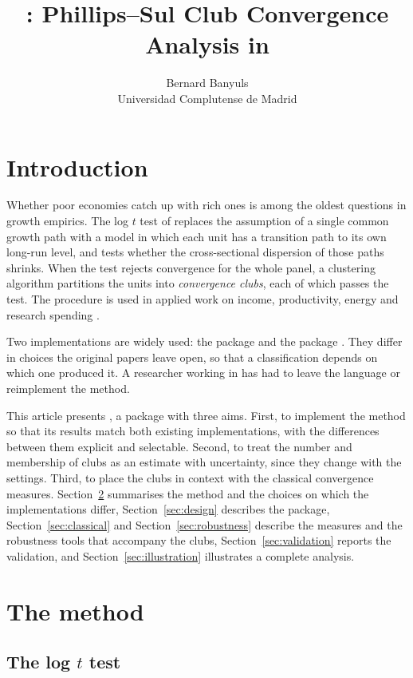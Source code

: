 \documentclass[article]{jss}
\author{Bernard Banyuls\\Universidad Complutense de Madrid}
\title{\pkg{convergence-clubs}: Phillips--Sul Club Convergence Analysis in \proglang{Python}}
\begin{document}
\section{Introduction} \label{sec:intro}

Whether poor economies catch up with rich ones is among the oldest questions in growth
empirics. The log $t$ test of \citet{PhillipsSul2007} replaces the assumption of a single
common growth path with a model in which each unit has a transition path to its own
long-run level, and tests whether the cross-sectional dispersion of those paths shrinks.
When the test rejects convergence for the whole panel, a clustering algorithm
\citep{PhillipsSul2009} partitions the units into \emph{convergence clubs}, each of which
passes the test. The procedure is used in applied work on income, productivity, energy and
research spending \citep[for example][]{BanyulsVides2025}.

Two implementations are widely used: the  package 
\citep{SicheraPizzuto2019} and the  package 
\citep{Du2017}. They differ in choices the original papers leave open, so that a
classification depends on which one produced it. A researcher working in 
has had to leave the language or reimplement the method.

This article presents , a  package with three aims.
First, to implement the method so that its results match both existing implementations,
with the differences between them explicit and selectable. Second, to treat the number
and membership of clubs as an estimate with uncertainty, since they change with the
settings. Third, to place the clubs in context with the classical convergence measures.
Section~\ref{sec:method} summarises the method and the choices on which the
implementations differ, Section~\ref{sec:design} describes the package,
Section~\ref{sec:classical} and Section~\ref{sec:robustness} describe the measures and the
robustness tools that accompany the clubs, Section~\ref{sec:validation} reports the
validation, and Section~\ref{sec:illustration} illustrates a complete analysis.

\section{The method} \label{sec:method}

\subsection{The log $t$ test}
\end{document}
